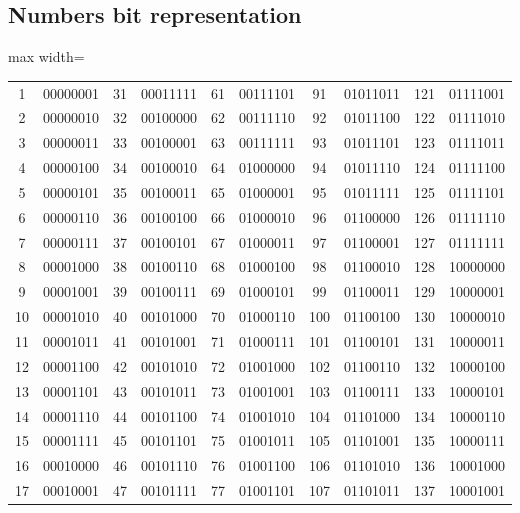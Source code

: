 \documentclass[letterpaper,landscape]{article}
\begin{document}
\subsection{Numbers bit representation}

\begin{center}
    \begin{adjustbox}{max width=\columnwidth}
    \renewcommand{\arraystretch}{1.3}
    \begin{tabular}{c|c||c|c||c|c||c|c||c|c}
      1 & 00000001 & 31 & 00011111 & 61 & 00111101 & 91 & 01011011 & 121 & 01111001 \\
      2 & 00000010 & 32 & 00100000 & 62 & 00111110 & 92 & 01011100 & 122 & 01111010 \\
      3 & 00000011 & 33 & 00100001 & 63 & 00111111 & 93 & 01011101 & 123 & 01111011 \\
      4 & 00000100 & 34 & 00100010 & 64 & 01000000 & 94 & 01011110 & 124 & 01111100 \\
      5 & 00000101 & 35 & 00100011 & 65 & 01000001 & 95 & 01011111 & 125 & 01111101 \\
      6 & 00000110 & 36 & 00100100 & 66 & 01000010 & 96 & 01100000 & 126 & 01111110 \\
      7 & 00000111 & 37 & 00100101 & 67 & 01000011 & 97 & 01100001 & 127 & 01111111 \\
      8 & 00001000 & 38 & 00100110 & 68 & 01000100 & 98 & 01100010 & 128 & 10000000 \\
      9 & 00001001 & 39 & 00100111 & 69 & 01000101 & 99 & 01100011 & 129 & 10000001 \\
      10 & 00001010 & 40 & 00101000 & 70 & 01000110 & 100 & 01100100 & 130 & 10000010 \\
      11 & 00001011 & 41 & 00101001 & 71 & 01000111 & 101 & 01100101 & 131 & 10000011 \\
      12 & 00001100 & 42 & 00101010 & 72 & 01001000 & 102 & 01100110 & 132 & 10000100 \\
      13 & 00001101 & 43 & 00101011 & 73 & 01001001 & 103 & 01100111 & 133 & 10000101 \\
      14 & 00001110 & 44 & 00101100 & 74 & 01001010 & 104 & 01101000 & 134 & 10000110 \\
      15 & 00001111 & 45 & 00101101 & 75 & 01001011 & 105 & 01101001 & 135 & 10000111 \\
      16 & 00010000 & 46 & 00101110 & 76 & 01001100 & 106 & 01101010 & 136 & 10001000 \\
      17 & 00010001 & 47 & 00101111 & 77 & 01001101 & 107 & 01101011 & 137 & 10001001 \\

\end{tabular}
\end{adjustbox}
\end{center}
\end{document}
